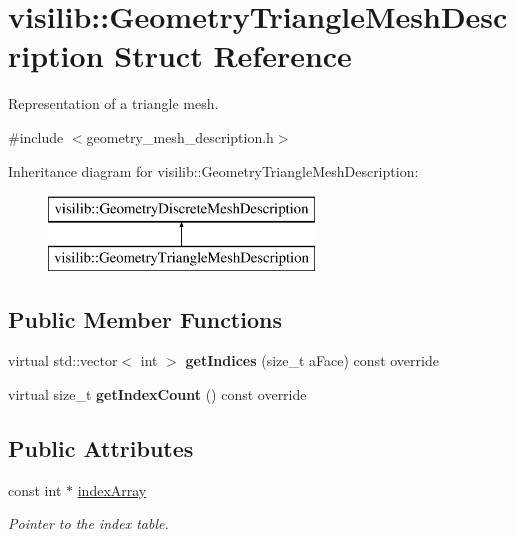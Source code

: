 \hypertarget{structvisilib_1_1_geometry_triangle_mesh_description}{}\section{visilib\+::Geometry\+Triangle\+Mesh\+Description Struct Reference}
\label{structvisilib_1_1_geometry_triangle_mesh_description}


Representation of a triangle mesh. 




{\ttfamily \#include $<$geometry\+\_\+mesh\+\_\+description.\+h$>$}

Inheritance diagram for visilib\+::Geometry\+Triangle\+Mesh\+Description\+:\begin{figure}[H]
\begin{center}
\leavevmode
\includegraphics[height=2.000000cm]{structvisilib_1_1_geometry_triangle_mesh_description}
\end{center}
\end{figure}
\subsection*{Public Member Functions}
\begin{DoxyCompactItemize}
\item 
\mbox{\label{structvisilib_1_1_geometry_triangle_mesh_description_ac3bbf60ef76b5bbbd8731ca75113a1c7}} 
virtual std\+::vector$<$ int $>$ {\bfseries get\+Indices} (size\+\_\+t a\+Face) const override
\item 
\mbox{\label{structvisilib_1_1_geometry_triangle_mesh_description_a7fd6d7e8f1a287607a18ad507be4c283}} 
virtual size\+\_\+t {\bfseries get\+Index\+Count} () const override
\end{DoxyCompactItemize}
\subsection*{Public Attributes}
\begin{DoxyCompactItemize}
\item 
\mbox{\label{structvisilib_1_1_geometry_triangle_mesh_description_a161f5e6343b08d34bac9eb58b6ee6aa5}} 
const int $\ast$ \mbox{\hyperlink{structvisilib_1_1_geometry_triangle_mesh_description_a161f5e6343b08d34bac9eb58b6ee6aa5}{index\+Array}}
\begin{DoxyCompactList}\small\item\em Pointer to the index table. \end{DoxyCompactList}\end{DoxyCompactItemize}


